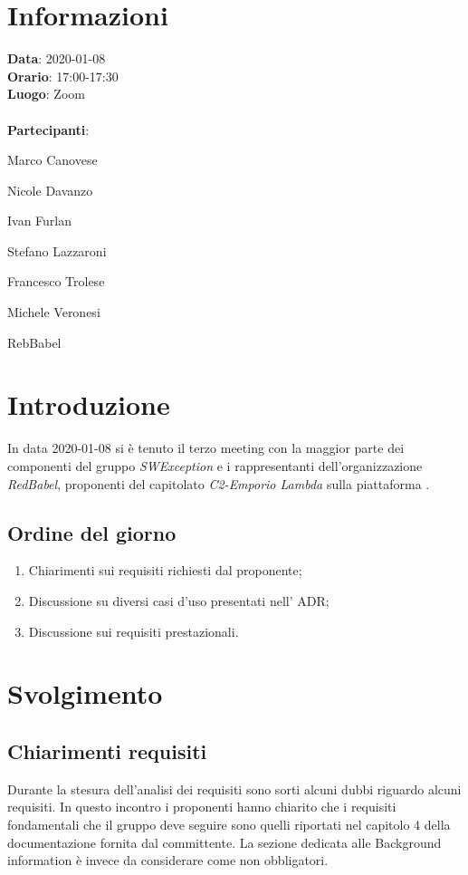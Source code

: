 \section{Informazioni}
\textbf{Data}: 2020-01-08\\
\textbf{Orario}: 17:00-17:30\\
\textbf{Luogo}: Zoom\\\\
\textbf{Partecipanti}:\begin{list}{*}{\setlength{\itemsep}{0cm}}
	\item Marco Canovese
	\item Nicole Davanzo
	\item Ivan Furlan
	\item Stefano Lazzaroni
	\item Francesco Trolese
	\item Michele Veronesi
	\item RebBabel
\end{list}

\section{Introduzione}
In data 2020-01-08 si è tenuto il terzo meeting con la maggior parte dei componenti del gruppo \textit{SWException} e i rappresentanti dell'organizzazione \textit{RedBabel}, proponenti del capitolato \textit{C2-Emporio Lambda} sulla piattaforma . \\

\subsection{Ordine del giorno}
\begin{enumerate}
    \item Chiarimenti sui requisiti richiesti dal proponente;
    \item Discussione su diversi casi d'uso presentati nell' ADR;
    \item Discussione sui requisiti prestazionali.
\end{enumerate}

\section{Svolgimento}

\subsection{Chiarimenti requisiti}
Durante la stesura dell'analisi dei requisiti sono sorti alcuni dubbi riguardo alcuni requisiti.
In questo incontro i proponenti hanno chiarito che i requisiti fondamentali che il gruppo deve seguire sono quelli riportati nel capitolo 4 della documentazione fornita dal committente.
La sezione dedicata alle Background information è invece da considerare come non obbligatori.

